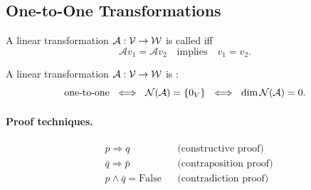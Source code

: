\subsection{One-to-One Transformations}\label{ss:one-to-one}

\begin{definition}
A linear transformation $\mathcal{A}:\mathcal{V}\to\mathcal{W}$ is called  iff
\[
\mathcal{A}v_1=\mathcal{A}v_2 \quad\text{implies}\quad v_1=v_2.
\]
\end{definition}

\begin{center}
\end{center}

\begin{proposition}
A linear transformation $\mathcal{A}:\mathcal{V}\to\mathcal{W}$ is :
\[
\text{one-to-one} \ \iff\ \Null(\mathcal{A})=\{0_V\}
\ \iff\ \dim\Null(\mathcal{A})=0.
\]
\end{proposition}

\paragraph{Proof techniques.}
\begin{align*}
&p\Rightarrow q && \text{(constructive proof)}\\
&\bar q\Rightarrow \bar p && \text{(contraposition proof)}\\
&p\wedge \bar q=\text{False} && \text{(contradiction proof)}
\end{align*}

